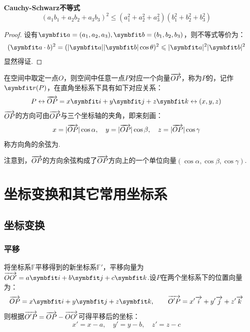 \begin{theorem}
    \label{thm:CauchySchwarzInequality}
    \textbf{Cauchy-Schwarz不等式}
    \[(a_1b_1 + a_2b_2 + a_3b_3)^2 \leqslant (a_1^2 + a_2^2 + a_3^2)(b_1^2 + b_2^2 + b_3^2)\]
\end{theorem}

\begin{proof}
    设有$\vb{a} = (a_1,a_2,a_3),\vb{b}=(b_1,b_2,b_3)$，则不等式等价为：
    \[(\vb{a \cdot b})^2 = (|\vb{a}||\vb{b}|\cos\theta)^2 \leqslant |\vb{a}|^2 |\vb{b}|^2\]
    显然得证.
\end{proof}

\begin{definition}
    在空间中取定一点$O$，则空间中任意一点$P$对应一个向量$\overrightarrow{OP}$，称为$P$的，记作$\vb{r}(P)$，在直角坐标系下具有如下对应关系：
    \[P \leftrightarrow \va{OP} = x\vb{i} + y\vb{j} + z\vb{k} \leftrightarrow (x,y,z)\]
    $\overrightarrow{OP}$的方向可由$\overrightarrow{OP}$与三个坐标轴的夹角，即来刻画：
    \[x = |\overrightarrow{OP}|\cos\alpha,\quad y = |\overrightarrow{OP}|\cos\beta,\quad z = |\overrightarrow{OP}|\cos\gamma\]
    称方向角的余弦为.
\end{definition}
注意到，$\overrightarrow{OP}$的方向余弦构成了$\overrightarrow{OP}$方向上的一个单位向量$(\cos\alpha,\cos\beta,\cos\gamma)$.


\section{坐标变换和其它常用坐标系}
\subsection{坐标变换}
\subsubsection{平移}
将坐标系$\mathbb{F}$平移得到的新坐标系$\mathbb{F'}$，平移向量为$\va{OO'} = a\vb{i} + b\vb{j} + c\vb{k}$.设$P$在两个坐标系下的位置向量为：
\[\va{OP} = x\vb{i} + y\vb{j} + z\vb{k},\qquad \va{O'P} = x'\va{i} + y'\va{j} + z'\va{k}\]
则根据$\overrightarrow{O'P} = \overrightarrow{OP} - \overrightarrow{OO'}$可得平移后的坐标：
\[x'=x-a,\quad y'=y-b,\quad z'=z-c\]


